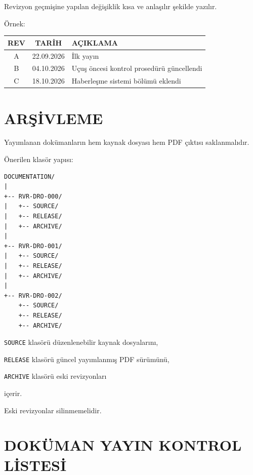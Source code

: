 \documentclass[11pt,a4paper]{article}
\begin{document}
Revizyon geçmişine yapılan değişiklik kısa ve anlaşılır şekilde yazılır.

Örnek:

\begin{center}

\begin{tabularx}{0.95\textwidth}{|c|c|X|}
\hline
REV & TARİH & AÇIKLAMA \\
\hline
A & 22.09.2026 & İlk yayın \\
\hline
B & 04.10.2026 & Uçuş öncesi kontrol prosedürü güncellendi \\
\hline
C & 18.10.2026 & Haberleşme sistemi bölümü eklendi \\
\hline
\end{tabularx}

\end{center}


\newpage

\section{ARŞİVLEME}

Yayımlanan dokümanların hem kaynak dosyası hem PDF çıktısı saklanmalıdır.

Önerilen klasör yapısı:

\begin{lstlisting}
DOCUMENTATION/
|
+-- RVR-DRO-000/
|   +-- SOURCE/
|   +-- RELEASE/
|   +-- ARCHIVE/
|
+-- RVR-DRO-001/
|   +-- SOURCE/
|   +-- RELEASE/
|   +-- ARCHIVE/
|
+-- RVR-DRO-002/
    +-- SOURCE/
    +-- RELEASE/
    +-- ARCHIVE/
\end{lstlisting}

\texttt{SOURCE} klasörü düzenlenebilir kaynak dosyalarını,

\texttt{RELEASE} klasörü güncel yayımlanmış PDF sürümünü,

\texttt{ARCHIVE} klasörü eski revizyonları

içerir.

Eski revizyonlar silinmemelidir.


\newpage

\section{DOKÜMAN YAYIN KONTROL LİSTESİ}
\end{document}
